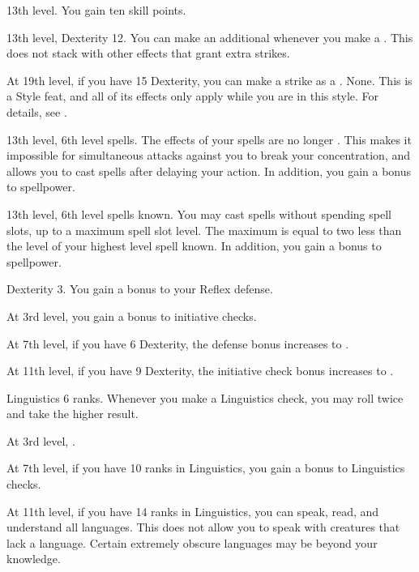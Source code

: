     \featpre 13th level.
    \featben You gain ten skill points.

    \featpres 13th level, Dexterity 12.
    \featben You can make an additional  whenever you make a  .
    This does not stack with other effects that grant extra strikes.

    At 19th level, if you have 15 Dexterity, you can make a strike as a .
    \stylereq None.
     This is a Style feat, and all of its effects only apply while you are in this style.
    For details, see .

    \featpre 13th level, 6th level spells.
    \featben The effects of your spells are no longer .
    This makes it impossible for simultaneous attacks against you to break your concentration, and allows you to cast spells after delaying your action.
    In addition, you gain a  bonus to spellpower.

    \featpres 13th level, 6th level spells known.
    \featben You may cast spells without spending spell slots, up to a maximum spell slot level.
    The maximum is equal to two less than the level of your highest level spell known.
    In addition, you gain a  bonus to spellpower.

    \featpre Dexterity 3.
    \featben You gain a  bonus to your Reflex defense.

    At 3rd level, you gain a  bonus to initiative checks.

    At 7th level, if you have 6 Dexterity, the defense bonus increases to .

    At 11th level, if you have 9 Dexterity, the initiative check bonus increases to .

    \featpre Linguistics 6 ranks.
    \featben Whenever you make a Linguistics check, you may roll twice and take the higher result.

    At 3rd level, \tdash.

    At 7th level, if you have 10 ranks in Linguistics, you gain a  bonus to Linguistics checks.

    At 11th level, if you have 14 ranks in Linguistics, you can speak, read, and understand all languages.
    This does not allow you to speak with creatures that lack a language.
    Certain extremely obscure languages may be beyond your knowledge.


